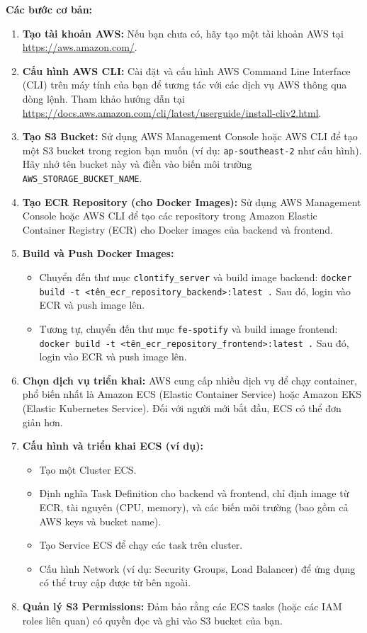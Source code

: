 \textbf{Các bước cơ bản:}
\begin{enumerate}
    \item \textbf{Tạo tài khoản AWS:} Nếu bạn chưa có, hãy tạo một tài khoản AWS tại \url{https://aws.amazon.com/}.
    \item \textbf{Cấu hình AWS CLI:} Cài đặt và cấu hình AWS Command Line Interface (CLI) trên máy tính của bạn để tương tác với các dịch vụ AWS thông qua dòng lệnh. Tham khảo hướng dẫn tại \url{https://docs.aws.amazon.com/cli/latest/userguide/install-cliv2.html}.
    \item \textbf{Tạo S3 Bucket:} Sử dụng AWS Management Console hoặc AWS CLI để tạo một S3 bucket trong region bạn muốn (ví dụ: \texttt{ap-southeast-2} như cấu hình). Hãy nhớ tên bucket này và điền vào biến môi trường \texttt{AWS\_STORAGE\_BUCKET\_NAME}.
    \item \textbf{Tạo ECR Repository (cho Docker Images):} Sử dụng AWS Management Console hoặc AWS CLI để tạo các repository trong Amazon Elastic Container Registry (ECR) cho Docker images của backend và frontend.
    \item \textbf{Build và Push Docker Images:}
    \begin{itemize}
        \item Chuyển đến thư mục \texttt{clontify\_server} và build image backend: \texttt{docker build -t <tên\_ecr\_repository\_backend>:latest .} Sau đó, login vào ECR và push image lên.
        \item Tương tự, chuyển đến thư mục \texttt{fe-spotify} và build image frontend: \texttt{docker build -t <tên\_ecr\_repository\_frontend>:latest .} Sau đó, login vào ECR và push image lên.
    \end{itemize}
    \item \textbf{Chọn dịch vụ triển khai:} AWS cung cấp nhiều dịch vụ để chạy container, phổ biến nhất là Amazon ECS (Elastic Container Service) hoặc Amazon EKS (Elastic Kubernetes Service). Đối với người mới bắt đầu, ECS có thể đơn giản hơn.
    \item \textbf{Cấu hình và triển khai ECS (ví dụ):}
    \begin{itemize}
        \item Tạo một Cluster ECS.
        \item Định nghĩa Task Definition cho backend và frontend, chỉ định image từ ECR, tài nguyên (CPU, memory), và các biến môi trường (bao gồm cả AWS keys và bucket name).
        \item Tạo Service ECS để chạy các task trên cluster.
        \item Cấu hình Network (ví dụ: Security Groups, Load Balancer) để ứng dụng có thể truy cập được từ bên ngoài.
    \end{itemize}
    \item \textbf{Quản lý S3 Permissions:} Đảm bảo rằng các ECS tasks (hoặc các IAM roles liên quan) có quyền đọc và ghi vào S3 bucket của bạn.
\end{enumerate}
